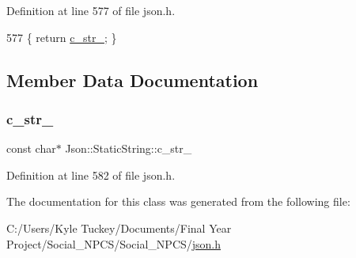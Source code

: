 Definition at line 577 of file json.\+h.


\begin{DoxyCode}
577 \{ \textcolor{keywordflow}{return} \hyperlink{class_json_1_1_static_string_a9f0d9e8caee8f8db14e2c8c24760dffd}{c\_str\_}; \}
\end{DoxyCode}


\subsection{Member Data Documentation}
\mbox{\label{class_json_1_1_static_string_a9f0d9e8caee8f8db14e2c8c24760dffd}} 
\subsubsection{\texorpdfstring{c\+\_\+str\+\_\+}{c\_str\_}}
{\footnotesize\ttfamily const char$\ast$ Json\+::\+Static\+String\+::c\+\_\+str\+\_\+\hspace{0.3cm}{\ttfamily [private]}}



Definition at line 582 of file json.\+h.



The documentation for this class was generated from the following file\+:\begin{DoxyCompactItemize}
\item 
C\+:/\+Users/\+Kyle Tuckey/\+Documents/\+Final Year Project/\+Social\+\_\+\+N\+P\+C\+S/\+Social\+\_\+\+N\+P\+C\+S/\hyperlink{json_8h}{json.\+h}\end{DoxyCompactItemize}
